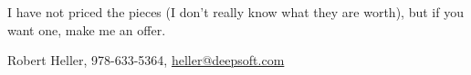 \documentclass[12pt]{article}
\begin{document}
I have not priced the pieces (I don't really know what they are worth), but if 
you want one, make me an offer.

Robert Heller, 978-633-5364, \url{heller@deepsoft.com}



%

%

%
%
%
%
\end{document}
